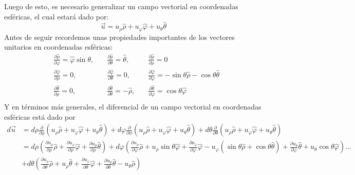 \documentclass[11pt,letterpaper]{article}
\begin{document}
Luego de esto, es necesario generalizar un campo vectorial en coordenadas esféricas, el cual estará dado por:
\begin{equation}
    \vec{u}=u_\rho\hat{\rho}+u_\varphi\hat{\varphi} + u_\theta\hat{\theta}
\end{equation}
Antes de seguir recordemos unas propiedades importantes de los vectores unitarios en coordenadas esféricas: 
\begin{align*}
   & \frac{\partial \hat{\rho}}{\partial \varphi} = \hat{\varphi} \sin{\theta}, & \quad \frac{\partial \hat{\rho}}{\partial \theta} = \hat{\theta} , & \quad \frac{\partial \hat{\rho}}{\partial \rho} = 0 \\
    & \frac{\partial \hat{\varphi}}{\partial \rho} = 0,&  \quad \frac{\partial \hat{\varphi}}{\partial \theta} =0, & \quad \frac{\partial \hat{\varphi}}{\partial \varphi}=-\sin{\theta}\hat{\rho}-\cos{\theta}\hat{\theta} \\
    & \frac{\partial \hat{\theta}}{\partial \rho}= 0, & \quad \frac{\partial \hat{\theta}}{\partial \theta}=-\hat{\rho} , & \quad \frac{\partial \hat{\theta}}{\partial \varphi}= \cos{\theta}\hat{\varphi} \\
\end{align*}
Y en términos más generales, el diferencial de un campo vectorial en coordenadas esféricas está dado por
\begin{align*}
    d\vec{u} & = d\rho \frac{\partial}{\partial \rho}(u_\rho\hat{\rho}+u_\varphi\hat{\varphi} + u_\theta\hat{\theta}) + d\varphi\frac{\partial}{\partial \phi}(u_\rho\hat{\rho}+u_\varphi\hat{\varphi} + u_\theta\hat{\theta}) + d\theta\frac{\partial}{\partial \theta}(u_\rho\hat{\rho}+u_\varphi\hat{\varphi} + u_\theta\hat{\theta}) \\
    & = d\rho \left( \frac{\partial u_\rho}{\partial \rho}\hat{\rho} + \frac{\partial u_\varphi}{\partial \rho}\hat{\varphi} + \frac{\partial u_\theta}{\partial \rho}\hat{\theta} \right) + d\varphi \left( \frac{\partial u_\rho}{\partial \varphi} \hat{\rho}+ u_\rho\sin{\theta}\hat{\varphi}  + \frac{\partial u_\varphi}{\partial \varphi}\hat{\varphi}  -u_\varphi \left( \sin{\theta}\hat{\rho} + \cos{\theta}\hat{\theta} \right)+  \frac{\partial u_\theta}{\partial \varphi}\hat{\theta} + u_\theta\cos{\theta}\hat{\varphi}\right)\dots \\ &  
    + d\theta \left(  \frac{\partial u_\rho}{\partial \theta}\hat{\rho} + u_\rho\hat{\theta} + \frac{\partial u_\varphi}{\partial \theta}\hat{\varphi} + \frac{\partial u_\theta}{\partial \theta}\hat{\theta} - u_\theta\hat{\rho}\right)
\end{align*}
\end{document}
